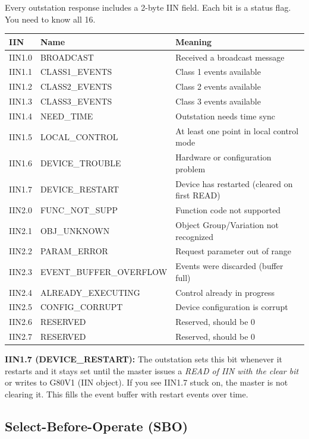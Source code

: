 \documentclass[11pt,twoside]{article}
\begin{document}
Every outstation response includes a 2-byte IIN field. Each bit is a status flag. You need to know all 16.

\begin{tabularx}{\textwidth}{llX}
\toprule
\textbf{IIN} & \textbf{Name} & \textbf{Meaning} \\
\midrule
IIN1.0 & BROADCAST & Received a broadcast message \\
IIN1.1 & CLASS1\_EVENTS & Class 1 events available \\
IIN1.2 & CLASS2\_EVENTS & Class 2 events available \\
IIN1.3 & CLASS3\_EVENTS & Class 3 events available \\
IIN1.4 & NEED\_TIME & Outstation needs time sync \\
IIN1.5 & LOCAL\_CONTROL & At least one point in local control mode \\
IIN1.6 & DEVICE\_TROUBLE & Hardware or configuration problem \\
IIN1.7 & DEVICE\_RESTART & Device has restarted (cleared on first READ) \\
\midrule
IIN2.0 & FUNC\_NOT\_SUPP & Function code not supported \\
IIN2.1 & OBJ\_UNKNOWN & Object Group/Variation not recognized \\
IIN2.2 & PARAM\_ERROR & Request parameter out of range \\
IIN2.3 & EVENT\_BUFFER\_OVERFLOW & Events were discarded (buffer full) \\
IIN2.4 & ALREADY\_EXECUTING & Control already in progress \\
IIN2.5 & CONFIG\_CORRUPT & Device configuration is corrupt \\
IIN2.6 & RESERVED & Reserved, should be 0 \\
IIN2.7 & RESERVED & Reserved, should be 0 \\
\bottomrule
\end{tabularx}

\begin{warnbox}
\textbf{IIN1.7 (DEVICE\_RESTART):} The outstation sets this bit whenever it restarts and it stays set until the master issues a \textit{READ of IIN with the clear bit} or writes to G80V1 (IIN object). If you see IIN1.7 stuck on, the master is not clearing it. This fills the event buffer with restart events over time.
\end{warnbox}

\subsection{Select-Before-Operate (SBO)}
\end{document}
